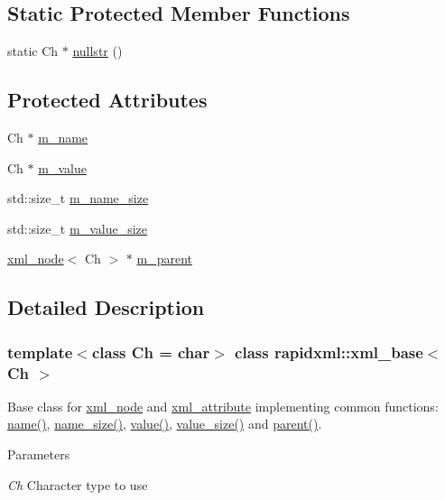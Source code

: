 \subsection*{Static Protected Member Functions}
\begin{DoxyCompactItemize}
\item 
static Ch $\ast$ \hyperlink{classrapidxml_1_1xml__base_ad96ff6b1e41dab3ff60b9bc4df769a75}{nullstr} ()
\end{DoxyCompactItemize}
\subsection*{Protected Attributes}
\begin{DoxyCompactItemize}
\item 
Ch $\ast$ \hyperlink{classrapidxml_1_1xml__base_afd9851ed43e14619db0d7075ef8e9e8a}{m\_\-name}
\item 
Ch $\ast$ \hyperlink{classrapidxml_1_1xml__base_a278a1ea63b0b70219b946cec47fa00ea}{m\_\-value}
\item 
std::size\_\-t \hyperlink{classrapidxml_1_1xml__base_a5a8c76a7274b4180213796422c4df76f}{m\_\-name\_\-size}
\item 
std::size\_\-t \hyperlink{classrapidxml_1_1xml__base_aa3a49d8ceddb8a8d7edb773a2226b89c}{m\_\-value\_\-size}
\item 
\hyperlink{classrapidxml_1_1xml__node}{xml\_\-node}$<$ Ch $>$ $\ast$ \hyperlink{classrapidxml_1_1xml__base_a90d5f660f078f66563fd7b2d8387ccb0}{m\_\-parent}
\end{DoxyCompactItemize}


\subsection{Detailed Description}
\subsubsection*{template$<$class Ch = char$>$ class rapidxml::xml\_\-base$<$ Ch $>$}

Base class for \hyperlink{classrapidxml_1_1xml__node}{xml\_\-node} and \hyperlink{classrapidxml_1_1xml__attribute}{xml\_\-attribute} implementing common functions: \hyperlink{classrapidxml_1_1xml__base_a9a09739310469995db078ebd0da3ed45}{name()}, \hyperlink{classrapidxml_1_1xml__base_a7e7f98b3d01e1eab8dc1ca69aad9af84}{name\_\-size()}, \hyperlink{classrapidxml_1_1xml__base_adcdaccff61c665f039d9344e447b7445}{value()}, \hyperlink{classrapidxml_1_1xml__base_a9fcf201ed0915ac18dd43b0b5dcfaf32}{value\_\-size()} and \hyperlink{classrapidxml_1_1xml__base_a7f31ae930f93852830234db1ae59c4c4}{parent()}. 
\begin{DoxyParams}{Parameters}
\item[{\em Ch}]Character type to use \end{DoxyParams}


